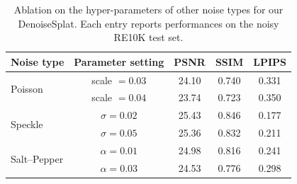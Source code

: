 \begin{table}
  \centering
  \caption{%
    Ablation on the hyper-parameters of other noise types for our DenoiseSplat. 
    Each entry reports performances on the noisy RE10K test set.
  }
  \label{tab:other_noise_ablation}
  \begin{tabular}{lcccc}
    \toprule
    Noise type & Parameter setting & PSNR & SSIM & LPIPS \\
    \midrule
    \multirow{2}{*}{Poisson} & scale $ = 0.03$ & 24.10 & 0.740 & 0.331\\
                             & scale $ = 0.04$ & 23.74 & 0.723 & 0.350\\
    \midrule
    \multirow{2}{*}{Speckle} & $\sigma = 0.02$ & 25.43 & 0.846 & 0.177\\
                             & $\sigma = 0.05$ & 25.36 & 0.832 & 0.211\\
    \midrule
    \multirow{2}{*}{Salt--Pepper} & $\alpha = 0.01$ & 24.98 & 0.816 & 0.241\\
                                  & $\alpha = 0.03$ & 24.53 & 0.776 & 0.298\\
    \bottomrule
  \end{tabular}
\end{table}
